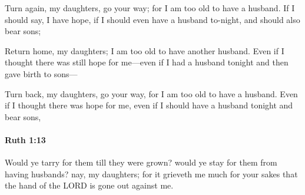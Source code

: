 			\begin{versebox}
					\item[BHS] 
					\item[LXX] 
					\item[ASV] Turn again, my daughters, go your way; for I am too old to have a husband. If I should say, I have hope, if I should even have a husband to-night, and should also bear sons;
					\item[NIV] Return home, my daughters; I am too old to have another husband. Even if I thought there was still hope for me—even if I had a husband tonight and then gave birth to sons—
					\item[NRSV] Turn back, my daughters, go your way, for I am too old to have a husband. Even if I thought there was hope for me, even if I should have a husband tonight and bear sons,
			\end{versebox}

		\paragraph{Ruth 1:13} %
			\label{RUTH-1-13}

			Would ye tarry for them till they were grown? would ye stay for them from having husbands? nay, my daughters; for it grieveth me much for your sakes that the hand of the LORD is gone out against me.

